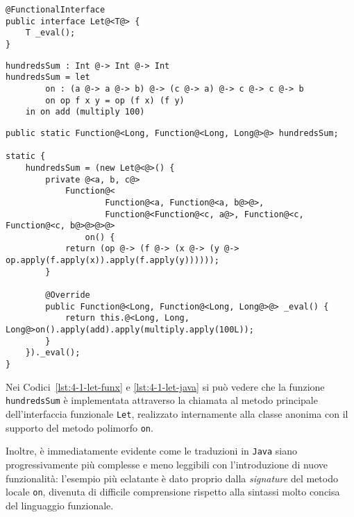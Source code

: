 \vspace{4mm}
\begin{lstlisting}[caption={Interfaccia funzionale per espressioni \texttt{let}}, style=javaCode, label={lst:4-1-let-interface-java}]
@FunctionalInterface
public interface Let@<T@> {
    T _eval();
}
\end{lstlisting}
\vspace{4mm}
\begin{lstlisting}[caption={Espressione \texttt{let} in \textbf{Funx}}, style=funxCode, label={lst:4-1-let-funx}]
hundredsSum : Int @-> Int @-> Int
hundredsSum = let
        on : (a @-> a @-> b) @-> (c @-> a) @-> c @-> c @-> b
        on op f x y = op (f x) (f y)
    in on add (multiply 100)
\end{lstlisting}
\vspace{4mm}
\begin{lstlisting}[caption={Corrispondente classe anonima in \texttt{Java}}, style=javaCode, label={lst:4-1-let-java}]
public static Function@<Long, Function@<Long, Long@>@> hundredsSum;

static {
    hundredsSum = (new Let@<@>() {
        private @<a, b, c@>
            Function@<
                    Function@<a, Function@<a, b@>@>,
                    Function@<Function@<c, a@>, Function@<c, Function@<c, b@>@>@>@>
                on() {
            return (op @-> (f @-> (x @-> (y @-> op.apply(f.apply(x)).apply(f.apply(y))))));
        }

        @Override
        public Function@<Long, Function@<Long, Long@>@> _eval() {
            return this.@<Long, Long, Long@>on().apply(add).apply(multiply.apply(100L));
        }
    })._eval();
}
\end{lstlisting}
\vspace{4mm}

\noindent Nei Codici~\ref{lst:4-1-let-funx} e \ref{lst:4-1-let-java} si può vedere che la funzione \texttt{hundredsSum}
è implementata attraverso la chiamata al metodo principale dell'interfaccia funzionale \texttt{Let},
realizzato internamente alla classe anonima con il supporto del metodo polimorfo \texttt{on}.

\noindent Inoltre, è immediatamente evidente come le traduzioni in \texttt{Java} siano progressivamente più complesse e meno leggibili
con l'introduzione di nuove funzionalità: l'esempio più eclatante è dato proprio dalla \textit{signature} del metodo locale \texttt{on},
divenuta di difficile comprensione rispetto alla sintassi molto concisa del linguaggio funzionale.